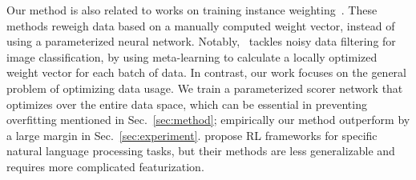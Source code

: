Our method is also related to works on training instance weighting~\citep{importance_weight,learn_reweight,jiang-zhai-2007-instance,domain_adapt_transfer}. These methods reweigh data based on a manually computed weight vector, instead of using a parameterized neural network.
Notably,~\citet{learn_reweight} tackles noisy data filtering for image classification, by using meta-learning to calculate a locally optimized weight vector for each batch of data.
In contrast, our work focuses on the general problem of optimizing data usage. We train a parameterized scorer network that optimizes over the entire data space, which can be essential in preventing overfitting mentioned in Sec.~\ref{sec:method};  empirically our method outperform \cite{learn_reweight} by a large margin in Sec.~\ref{sec:experiment}.
\citep{reinforce_cotrain,rl_nmt,learn_active_learn} propose RL frameworks for specific natural language processing tasks, but their methods are less generalizable and requires more complicated featurization.   












